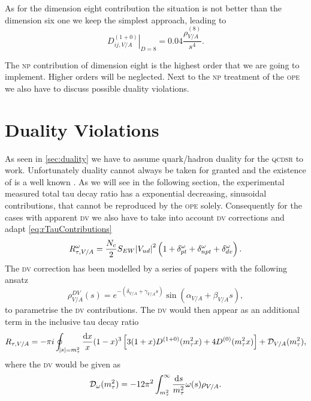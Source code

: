 \documentclass[../../index.tex]{subfiles}
\begin{document}
As for the dimension eight contribution the situation is not better than the
dimension six one we keep the simplest approach, leading to
\begin{equation}
  \left. D_{ij,V/A}^{(1+0)} \right\rvert_{D=8} = 0.04 \frac{\rho_{V/A}^{(8)}}{s^4}.
\end{equation}

The \textsc{np} contribution of dimension eight is the highest order that we are
going to implement. Higher orders will be neglected. Next to the \textsc{np}
treatment of the \textsc{ope} we also have to discuss possible duality
violations.



\section{Duality Violations}
As seen in \cref{sec:duality} we have to assume quark\-/hadron duality for the
\textsc{qcdsr} to work. Unfortunately duality cannot always be taken for granted
and the existence of  is a well known
\cite{Cata2008,Cata2009}. As we will see in the following section, the
experimental measured total tau decay ratio has a exponential decreasing,
sinusoidal contributions, that cannot be reproduced by the \textsc{ope} solely.
Consequently for the cases with apparent \textsc{dv} we also have to take into
account \textsc{dv} corrections and adapt \cref{eq:rTauContributions}
\begin{equation}
  R_{\tau,V/A}^\omega = \frac{N_c}{2}S_{EW} \abs{V_{ud}}^2 \left( 1 + \delta_{pt}^{\omega} + \delta_{npt}^{\omega} + \delta_{dv}^{\omega} \right).
\end{equation}
The \textsc{dv} correction has been modelled by a series of papers
\cite{Boito2011a,Boito2012,Boito2014} with the following ansatz 
\begin{equation}
  \rho_{V/A}^{DV}(s) = e^{-(\delta_{V/A}+\gamma_{V/A}s)} \sin(\alpha_{V/A} + \beta_{V/A}s),
\end{equation}
to parametrise the \textsc{dv} contributions. The \textsc{dv} would then appear
as an additional term in the inclusive tau decay ratio
\begin{equation}
  R_{\tau,V/A} = - \pi i \oint_{\abs{s}=m_\tau^2} \frac{\dif x}{x} (1 - x)^3 \left[ 3
    (1 + x) D^{(1+0)}(m_\tau^2 x) + 4 D^{(0)}(m_\tau^2 x) \right] +  \mathcal{D}_{V/A}(m_\tau^2),
\end{equation}
where the \textsc{dv} would be given as
\begin{equation}
  \mathcal{D}_\omega(m_\tau^2) = -12 \pi^2 \int_{m_\tau^2}^\infty \frac{\dif s}{m_\tau^2} \omega(s) \rho_{V/A}.
\end{equation}
\end{document}
